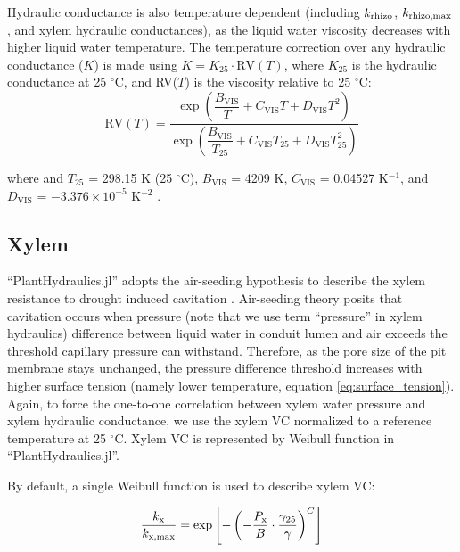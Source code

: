 \documentclass[twoside,10pt]{report}
\begin{document}
\par Hydraulic conductance is also temperature dependent (including $k_\text{rhizo}$, $k_\text{rhizo,max}$, and xylem hydraulic conductances), as the liquid water viscosity decreases with higher liquid water temperature. The temperature correction over any hydraulic conductance ($K$) is made using $K = K_{25} \cdot \text{RV}(T)$, where $K_{25}$ is the hydraulic conductance at 25 $^\circ$C, and RV($T$) is the viscosity relative to 25 $^\circ$C:
\begin{equation}
    \text{RV}(T) = \dfrac{\exp \left( \dfrac{B_\text{VIS}}{T} + C_\text{VIS}T + D_\text{VIS}T^2 \right)}
                         {\exp \left( \dfrac{B_\text{VIS}}{T_{25}} + C_\text{VIS}T_{25} + D_\text{VIS}T_{25}^2 \right)}
    \label{eq:viscosity_correction}
\end{equation}
\par \noindent where and $T_{25}$ = 298.15 K (25 $^\circ$C), $B_\text{VIS}$ = 4209 K, $C_\text{VIS}$ = 0.04527 K$^{-1}$, and $D_\text{VIS}$ = $-3.376 \times 10^{-5}$ K$^{-2}$ \citep{reid1987properties}.




\subsection{Xylem}
\par ``PlantHydraulics.jl'' adopts the air-seeding hypothesis to describe the xylem resistance to drought induced cavitation \citep{sperry1988mechanism}. Air-seeding theory posits that cavitation occurs when pressure (note that we use term ``pressure'' in xylem hydraulics) difference between liquid water in conduit lumen and air exceeds the threshold capillary pressure can withstand. Therefore, as the pore size of the pit membrane stays unchanged, the pressure difference threshold increases with higher surface tension (namely lower temperature, equation \ref{eq:surface_tension}). Again, to force the one-to-one correlation between xylem water pressure and xylem hydraulic conductance, we use the xylem VC normalized to a reference temperature at 25 $^\circ$C. Xylem VC is represented by Weibull function in ``PlantHydraulics.jl''.

\par By default, a single Weibull function is used to describe xylem VC:

\begin{equation}
    \dfrac{k_\text{x}}{k_\text{x,max}} = \exp \left[ -\left( -\dfrac{P_\text{x}}{B} \cdot \dfrac{\gamma_\text{25}}{\gamma} \right) ^ C \right]
    \label{eq:weibull_k_ratio}
\end{equation}
\end{document}
